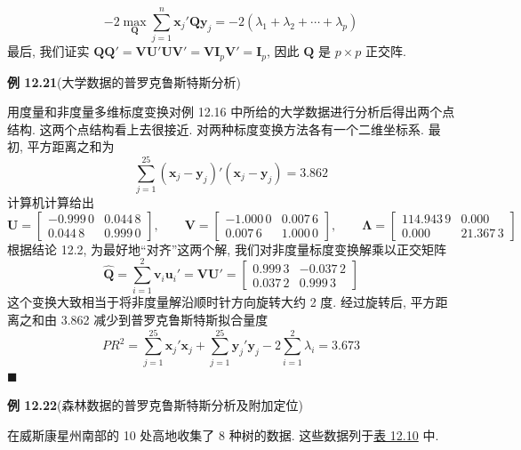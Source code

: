 
\[
-2\max_{\mathbf{Q}}\sum_{j=1}^{n}\mathbf{x}_{j}'\mathbf{Q}\mathbf{y}_{j}=-2(\lambda_{1}+\lambda_{2}+\cdots+\lambda_{p})
\]
最后, 我们证实 $\mathbf{Q}\mathbf{Q}'=\mathbf{V}\mathbf{U}'\mathbf{U}\mathbf{V}'=\mathbf{V}\mathbf{I}_{p}\mathbf{V}'=\mathbf{I}_{p}$, 因此 $\mathbf{Q}$ 是 $p\times p$ 正交阵.

\noindent\textbf{例 12.21}\quad (大学数据的普罗克鲁斯特斯分析)

用度量和非度量多维标度变换对例 12.16 中所给的大学数据进行分析后得出两个点结构. 这两个点结构看上去很接近. 对两种标度变换方法各有一个二维坐标系. 最初, 平方距离之和为
\[
\sum_{j=1}^{25}(\mathbf{x}_{j}-\mathbf{y}_{j})'(\mathbf{x}_{j}-\mathbf{y}_{j})=3.862
\]
计算机计算给出
\[
\mathbf{U}=\begin{bmatrix}-0.999\,0&0.044\,8\\0.044\,8&0.999\,0\end{bmatrix},\qquad
\mathbf{V}=\begin{bmatrix}-1.000\,0&0.007\,6\\0.007\,6&1.000\,0\end{bmatrix},\qquad
\boldsymbol{\Lambda}=\begin{bmatrix}114.943\,9&0.000\\0.000&21.367\,3\end{bmatrix}
\]
根据结论 12.2, 为最好地“对齐”这两个解, 我们对非度量标度变换解乘以正交矩阵
\[
\hat{\mathbf{Q}}=\sum_{i=1}^{2}\mathbf{v}_{i}\mathbf{u}_{i}'=\mathbf{V}\mathbf{U}'=\begin{bmatrix}0.999\,3&-0.037\,2\\0.037\,2&0.999\,3\end{bmatrix}
\]
这个变换大致相当于将非度量解沿顺时针方向旋转大约 2 度. 经过旋转后, 平方距离之和由 3.862 减少到普罗克鲁斯特斯拟合量度
\[
PR^{2}=\sum_{j=1}^{25}\mathbf{x}_{j}'\mathbf{x}_{j}+\sum_{j=1}^{25}\mathbf{y}_{j}'\mathbf{y}_{j}-2\sum_{i=1}^{2}\lambda_{i}=3.673
\]
\hfill$\blacksquare$

\noindent\textbf{例 12.22}\quad (森林数据的普罗克鲁斯特斯分析及附加定位)

在威斯康星州南部的 10 处高地收集了 8 种树的数据. 这些数据列于\hyperref[tab:12.10]{表 12.10} 中.

